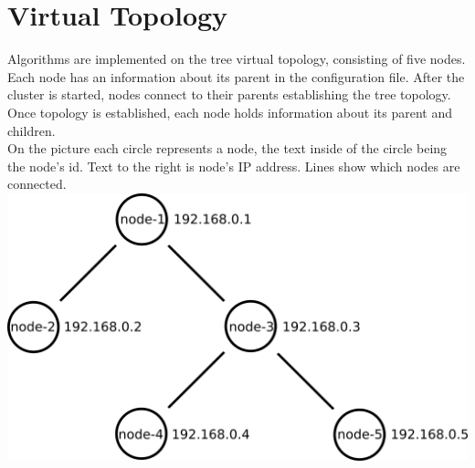 \documentclass{article}
\begin{document}
\section{Virtual Topology}
Algorithms are implemented on the tree virtual topology, consisting of five nodes. Each node has an information about its parent in the configuration file. After the cluster is started, nodes connect to their parents establishing the tree topology. Once topology is established, each node holds information about its parent and children.\\
On the picture each circle represents a node, the text inside of the circle being the node's id. Text to the right is node's IP address. Lines show which nodes are connected.\\
\includegraphics[width=\textwidth]{topology.png}
\end{document}
